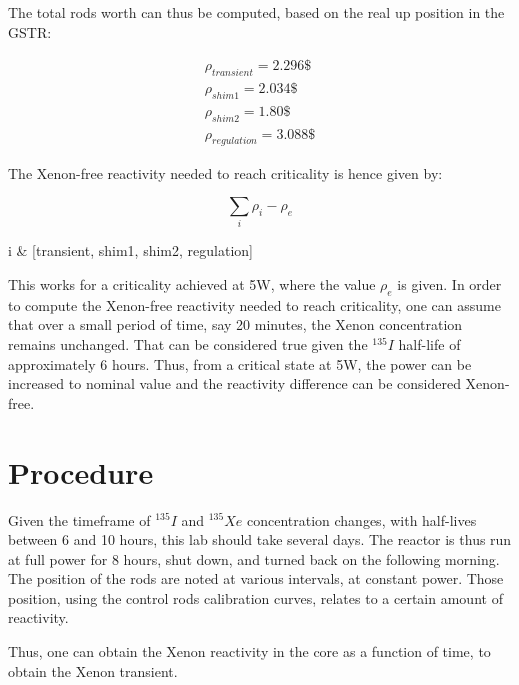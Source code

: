 The total rods worth can thus be computed, based on the real up position in the GSTR:

\begin{equation}
\begin{aligned}
\rho_{transient} = 2.296\$ \\
\rho_{shim1} = 2.034\$ \\
\rho_{shim2} = 1.80\$ \\
\rho_{regulation} = 3.088\$
\end{aligned}
\end{equation}

The Xenon-free reactivity needed to reach criticality is hence given by:

\begin{equation}
\sum_i{\rho_i} - \rho_e
\end{equation}
\begin{conditions}
 i  &  [transient, shim1, shim2, regulation]
\end{conditions}

This works for a criticality achieved at 5W, where the value $\rho_e$ is given. In order to compute the Xenon-free reactivity needed to reach criticality, one can assume that over a small period of time, say 20 minutes, the Xenon concentration remains unchanged. That can be considered true given the $^{135}I$ half-life of approximately 6 hours. Thus, from a critical state at 5W, the power can be increased to nominal value and the reactivity difference can be considered Xenon-free.

\section{Procedure}

Given the timeframe of $^{135}I$ and $^{135}Xe$ concentration changes, with half-lives between 6 and 10 hours, this lab should take several days. The reactor is thus run at full power for 8 hours, shut down, and turned back on the following morning. The position of the rods are noted at various intervals, at constant power. Those position, using the control rods calibration curves, relates to a certain amount of reactivity.

Thus, one can obtain the Xenon reactivity in the core as a function of time, to obtain the Xenon transient.


